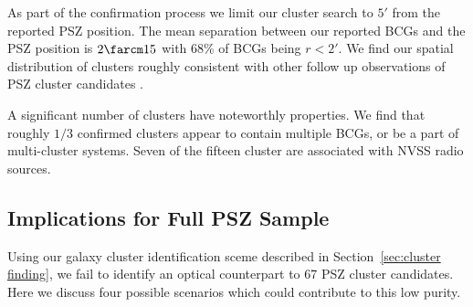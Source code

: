 \documentclass[apj, revtex4-1]{emulateapj}
\begin{document}
As part of the confirmation process we limit our cluster search to $5'$ from the reported PSZ position. The mean separation between our reported BCGs and the PSZ position is $2\farcm15$ with 68\% of BCGs being $r < 2'$. We find our spatial distribution of clusters roughly consistent with other follow up observations of PSZ cluster candidates .

A significant number of clusters have noteworthly properties. We find that roughly $1/3$ confirmed clusters appear to contain multiple BCGs, or be a part of multi-cluster systems. Seven of the fifteen cluster are associated with NVSS radio sources.


\subsection{Implications for Full PSZ Sample}
Using our galaxy cluster identification sceme described in Section~\ref{sec:cluster finding}, we fail to identify an optical counterpart to 67 PSZ cluster candidates. Here we discuss four possible scenarios which could contribute to this low purity.
\end{document}
